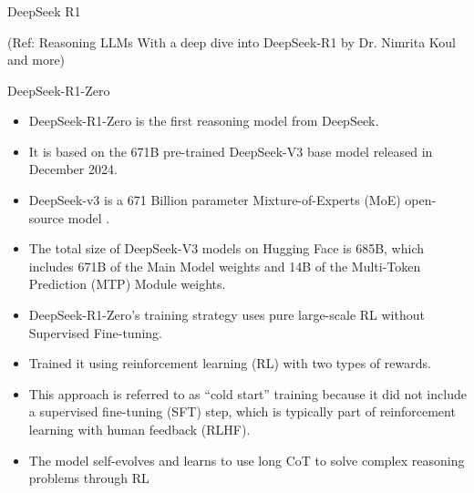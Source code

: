 
\begin{frame}[fragile]\frametitle{}
\begin{center}
{\Large DeepSeek R1}

{\tiny (Ref: Reasoning LLMs With a deep dive into DeepSeek-R1 by Dr. Nimrita Koul and more)}

\end{center}


\end{frame}




\begin{frame}[fragile]{DeepSeek-R1-Zero}


    \begin{itemize}
        \item  DeepSeek-R1-Zero is the first reasoning model from DeepSeek.  
		\item It is based on the 671B pre-trained DeepSeek-V3 base model released in December 2024.
        \item  DeepSeek-v3 is a 671 Billion parameter Mixture-of-Experts (MoE) open-
source model . 
        \item  The total size of DeepSeek-V3 models on Hugging Face is 685B, which 
includes 671B of the Main Model weights and 14B of the Multi-Token 
Prediction (MTP) Module weights.		
		\item DeepSeek-R1-Zero's training strategy uses pure large-scale RL without 
Supervised Fine-tuning. 
		\item  Trained it using reinforcement learning (RL) with two types of rewards. 
		\item This approach is referred to as “cold start” training because it did not include a supervised fine-tuning (SFT) step, which is typically part of reinforcement learning with human feedback (RLHF).
        \item  The model self-evolves and learns to use long CoT to solve complex 
reasoning problems through RL
    \end{itemize}
\end{frame}

